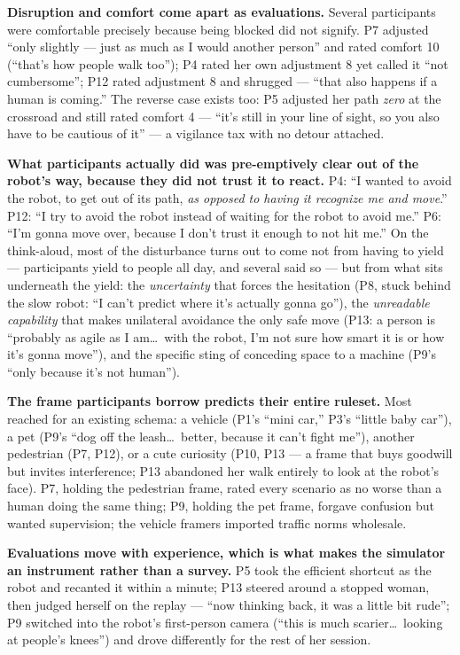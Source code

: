 \textbf{Disruption and comfort come apart as evaluations.} Several
participants were comfortable precisely because being blocked did not
signify. P7 adjusted ``only slightly --- just as much as I would
another person'' and rated comfort 10 (``that's how people walk too'');
P4 rated her own adjustment 8 yet called it ``not cumbersome''; P12
rated adjustment 8 and shrugged --- ``that also happens if a human is
coming.'' The reverse case exists too: P5 adjusted her path
\emph{zero} at the crossroad and still rated comfort 4 --- ``it's still
in your line of sight, so you also have to be cautious of it'' --- a
vigilance tax with no detour attached.

\textbf{What participants actually did was pre-emptively clear out of
the robot's way, because they did not trust it to react.} P4: ``I
wanted to avoid the robot, to get out of its path, \emph{as opposed to
having it recognize me and move}.'' P12: ``I try to avoid the robot
instead of waiting for the robot to avoid me.'' P6: ``I'm gonna move
over, because I don't trust it enough to not hit me.'' On the
think-aloud, most of the disturbance turns out to come not from having
to yield --- participants yield to people all day, and several said so
--- but from what sits underneath the yield: the \emph{uncertainty}
that forces the hesitation (P8, stuck behind the slow robot: ``I can't
predict where it's actually gonna go''), the \emph{unreadable
capability} that makes unilateral avoidance the only safe move (P13: a
person is ``probably as agile as I am\dots\ with the robot, I'm not
sure how smart it is or how it's gonna move''), and the specific sting
of conceding space to a machine (P9's ``only because it's not human'').

\textbf{The frame participants borrow predicts their entire ruleset.}
Most reached for an existing schema: a vehicle (P1's ``mini car,'' P3's
``little baby car''), a pet (P9's ``dog off the leash\dots\ better,
because it can't fight me''), another pedestrian (P7, P12), or a cute
curiosity (P10, P13 --- a frame that buys goodwill but invites
interference; P13 abandoned her walk entirely to look at the robot's
face). P7, holding the pedestrian frame, rated every scenario as no
worse than a human doing the same thing; P9, holding the pet frame,
forgave confusion but wanted supervision; the vehicle framers imported
traffic norms wholesale.

\textbf{Evaluations move with experience, which is what makes the
simulator an instrument rather than a survey.} P5 took the efficient
shortcut as the robot and recanted it within a minute; P13 steered
around a stopped woman, then judged herself on the replay --- ``now
thinking back, it was a little bit rude''; P9 switched into the robot's
first-person camera (``this is much scarier\dots\ looking at people's
knees'') and drove differently for the rest of her session.

